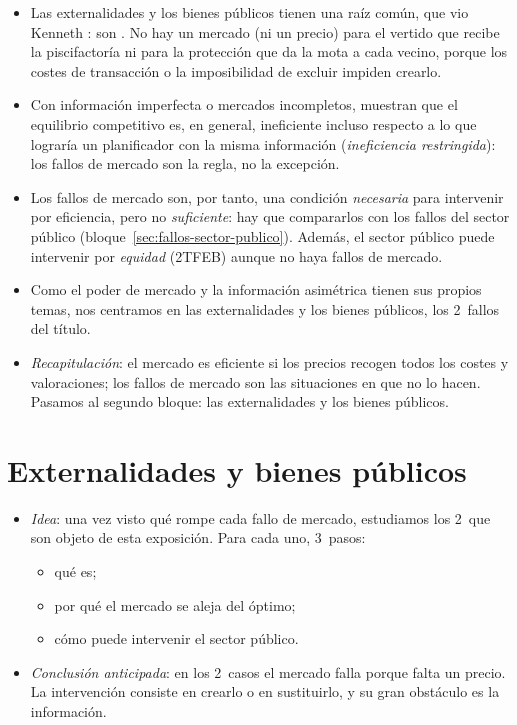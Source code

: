 \documentclass[11pt]{article}
\begin{document}
\begin{itemize}
\item Las externalidades y los bienes públicos tienen una raíz común, que vio Kenneth \textcite{Arrow1969Organization}: son . No hay un mercado (ni un precio) para el vertido que recibe la piscifactoría ni para la protección que da la mota a cada vecino, porque los costes de transacción o la imposibilidad de excluir impiden crearlo.
\item Con información imperfecta o mercados incompletos, \textcite{GreenwaldStiglitz1986Externalities} muestran que el equilibrio competitivo es, en general, ineficiente incluso respecto a lo que lograría un planificador con la misma información (\emph{ineficiencia restringida}): los fallos de mercado son la regla, no la excepción.
\item Los fallos de mercado son, por tanto, una condición \emph{necesaria} para intervenir por eficiencia, pero no \emph{suficiente}: hay que compararlos con los fallos del sector público (bloque~\ref{sec:fallos-sector-publico}). Además, el sector público puede intervenir por \emph{equidad} (2TFEB) aunque no haya fallos de mercado.
\item Como el poder de mercado y la información asimétrica tienen sus propios temas, nos centramos en las externalidades y los bienes públicos, los 2~fallos del título.
\item \emph{Recapitulación}: el mercado es eficiente si los precios recogen todos los costes y valoraciones; los fallos de mercado son las situaciones en que no lo hacen. Pasamos al segundo bloque: las externalidades y los bienes públicos.
\end{itemize}


\section{Externalidades y bienes públicos}\label{sec:externalidades-bienes-publicos}

\begin{itemize}
\item \emph{Idea}: una vez visto qué rompe cada fallo de mercado, estudiamos los 2~que son objeto de esta exposición. Para cada uno, 3~pasos:
  \begin{itemize}
  \item qué es;
  \item por qué el mercado se aleja del óptimo;
  \item cómo puede intervenir el sector público.
  \end{itemize}
\item \emph{Conclusión anticipada}: en los 2~casos el mercado falla porque falta un precio. La intervención consiste en crearlo o en sustituirlo, y su gran obstáculo es la información.
\end{itemize}
\end{document}
